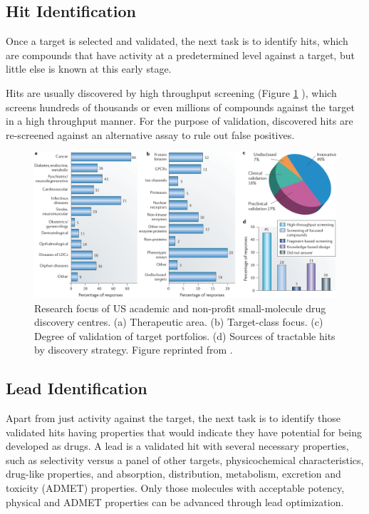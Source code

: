 \subsection{Hit Identification}

Once a target is selected and validated, the next task is to identify hits, which are compounds that have activity at a predetermined level against a target, but little else is known at this early stage.

Hits are usually discovered by high throughput screening \citep{795,504,736} (Figure \ref{fig:USAcademicDrugDiscoveryResearchFocus} \citep{721}), which screens hundreds of thousands or even millions of compounds against the target in a high throughput manner. For the purpose of validation, discovered hits are re-screened against an alternative assay to rule out false positives.

\begin{figure}
\centering
\includegraphics[width=\textwidth]{Background/USAcademicDrugDiscoveryResearchFocus.png}
\caption{Research focus of US academic and non-profit small-molecule drug discovery centres. (a) Therapeutic area. (b) Target-class focus. (c) Degree of validation of target portfolios. (d) Sources of tractable hits by discovery strategy. Figure reprinted from \citep{721}.}
\label{fig:USAcademicDrugDiscoveryResearchFocus}
\end{figure}

\subsection{Lead Identification}

Apart from just activity against the target, the next task is to identify those validated hits having properties that would indicate they have potential for being developed as drugs. A lead is a validated hit with several necessary properties, such as selectivity versus a panel of other targets, physicochemical characteristics, drug-like properties, and absorption, distribution, metabolism, excretion and toxicity (ADMET) properties. Only those molecules with acceptable potency, physical and ADMET properties can be advanced through lead optimization.

